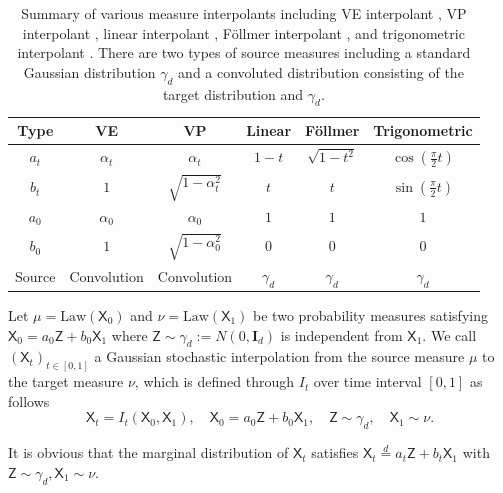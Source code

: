 \documentclass[twoside,11pt]{article}
\def\rmI{{\mathbf{I}}}
\numberwithin{equation}{section}
\begin{document}
\begin{table}[thb]
    \centering
    \begin{tabular}{cccccc}
    \toprule
    Type & VE & VP & Linear & F{\"o}llmer & Trigonometric \\
    \midrule
    $a_t$ & $\alpha_t$ & $\alpha_t$ & $1-t$ & $\sqrt{1 - t^2}$ & $\cos(\tfrac{\pi}{2}t)$ \\
    $b_t$ & $1$   & $\sqrt{1 - \alpha_t^2}$ & $t$ & $t$   & $\sin(\tfrac{\pi}{2}t)$ \\
    $a_0$ & $\alpha_0$ & $\alpha_0$              & $1$ & $1$   & $1$ \\
    $b_0$ & $1$   & $\sqrt{1 - \alpha_0^2}$ & $0$ & $0$   & $0$ \\
    Source & Convolution & Convolution & $\gamma_d$ & $\gamma_d$ & $\gamma_d$ \\
    \bottomrule
    \end{tabular}
    \caption{Summary of various measure interpolants including VE interpolant \citep{song2021scorebased}, VP interpolant \citep{song2021scorebased}, linear interpolant \citep{liu2023flow}, F{\"o}llmer interpolant \citep{dai2023lipschitz}, and trigonometric interpolant \citep{albergo2023building}. There are two types of source measures including a standard Gaussian distribution $\gamma_d$ and a convoluted distribution consisting of the target distribution and $\gamma_d$.}
    \label{tab:vec-interp}
\end{table}


\begin{definition}  \label{def:measure-interp}
Let $\mu = \mathrm{Law}(\mathsf{X}_0)$ and $\nu = \mathrm{Law}(\mathsf{X}_1)$ be two probability measures satisfying $\mathsf{X}_0 = a_0 \mathsf{Z} + b_0 \mathsf{X}_1$ where $\mathsf{Z} \sim \gamma_d:=N(0, \rmI_d)$ is independent from $\mathsf{X}_1$.
We call $(\mathsf{X}_t)_{t \in [0, 1]}$ a Gaussian stochastic interpolation from the source measure $\mu$ to the target measure $\nu$, which is defined through $I_t$ over time interval $[0, 1]$ as follows
\begin{equation}
    \label{eq:stoc-interpolation}
    \mathsf{X}_t = I_t (\mathsf{X}_0, \mathsf{X}_1), \quad \mathsf{X}_0 = a_0 \mathsf{Z} + b_0 \mathsf{X}_1, \quad \mathsf{Z} \sim \gamma_d, \quad \mathsf{X}_1 \sim \nu.
\end{equation}
\end{definition}

\begin{remark}
    It is obvious that the marginal distribution of $\mathsf{X}_t$ satisfies $\mathsf{X}_t \overset{d}{=} a_t \mathsf{Z} + b_t \mathsf{X}_1$ with $\mathsf{Z} \sim \gamma_d, \mathsf{X}_1 \sim \nu$.
\end{remark}
\end{document}
